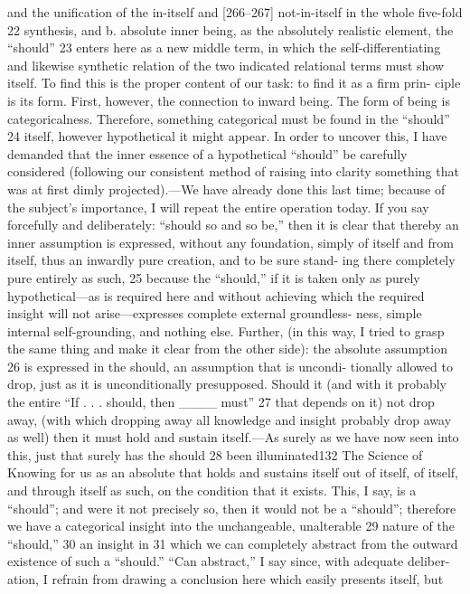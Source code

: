 and the unification of the in-itself and [266–267] not-in-itself in the whole
five-fold 22 synthesis, and
b. absolute inner being, as the absolutely realistic element, the “should” 23
enters here as a new middle term, in which the self-differentiating and
likewise synthetic relation of the two indicated relational terms must show
itself. To find this is the proper content of our task: to find it as a firm prin-
ciple is its form.
First, however, the connection to inward being. The form of being is
categoricalness. Therefore, something categorical must be found in the
“should” 24 itself, however hypothetical it might appear. In order to uncover this,
I have demanded that the inner essence of a hypothetical “should” be carefully
considered (following our consistent method of raising into clarity something
that was at first dimly projected).—We have already done this last time;
because of the subject’s importance, I will repeat the entire operation today.
If you say forcefully and deliberately: “should so and so be,” then it is clear
that thereby an inner assumption is expressed, without any foundation, simply
of itself and from itself, thus an inwardly pure creation, and to be sure stand-
ing there completely pure entirely as such, 25 because the “should,” if it is taken
only as purely hypothetical—as is required here and without achieving which
the required insight will not arise—expresses complete external groundless-
ness, simple internal self-grounding, and nothing else. Further, (in this way, I
tried to grasp the same thing and make it clear from the other side): the
absolute assumption 26 is expressed in the should, an assumption that is uncondi-
tionally allowed to drop, just as it is unconditionally presupposed. Should it
(and with it probably the entire “If . . . should, then ____ must” 27 that depends
on it) not drop away, (with which dropping away all knowledge and insight
probably drop away as well) then it must hold and sustain itself.—As surely as
we have now seen into this, just that surely has the should 28 been illuminated132
The Science of Knowing
for us as an absolute that holds and sustains itself out of itself, of itself, and
through itself as such, on the condition that it exists. This, I say, is a “should”;
and were it not precisely so, then it would not be a “should”; therefore we have
a categorical insight into the unchangeable, unalterable 29 nature of the
“should,” 30 an insight in 31 which we can completely abstract from the outward
existence of such a “should.” “Can abstract,” I say since, with adequate deliber-
ation, I refrain from drawing a conclusion here which easily presents itself, but
